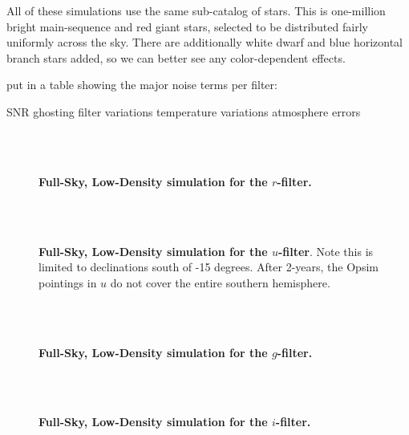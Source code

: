 \documentclass[12pt,preprint]{aastex}
\begin{document}
All of these simulations use the same sub-catalog of stars.  This is one-million bright main-sequence and red giant stars, selected to be distributed fairly uniformly across the sky.  There are additionally white dwarf and blue horizontal branch stars added, so we can better see any color-dependent effects.



put in a table showing the major noise terms per filter:

SNR    ghosting    filter variations   temperature variations   atmosphere errors

\begin{figure}
 \\
 \\
\caption{ {\bf Full-Sky, Low-Density simulation for the $r$-filter.}  \label{fig:r1e6}}
\end{figure}


\begin{figure}
 \\
 \\
\caption{ {\bf Full-Sky, Low-Density simulation for the $u$-filter}.  Note this is limited to declinations south of -15 degrees.  After 2-years, the Opsim pointings in $u$ do not cover the entire southern hemisphere.  \label{fig:u1e6}}
\end{figure}


\begin{figure}
 \\
 \\
\caption{ {\bf Full-Sky, Low-Density simulation for the $g$-filter.}  \label{fig:g1e6}}
\end{figure}
 

\begin{figure}
 \\
 \\
\caption{ {\bf Full-Sky, Low-Density simulation for the $i$-filter.}  \label{fig:i1e6}}
\end{figure}
\end{document}
